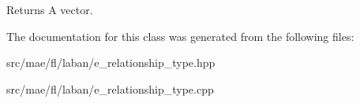 \begin{DoxyReturn}{Returns}
A vector. 
\end{DoxyReturn}


The documentation for this class was generated from the following files\-:\begin{DoxyCompactItemize}
\item 
src/mae/fl/laban/e\-\_\-relationship\-\_\-type.\-hpp\item 
src/mae/fl/laban/e\-\_\-relationship\-\_\-type.\-cpp\end{DoxyCompactItemize}
